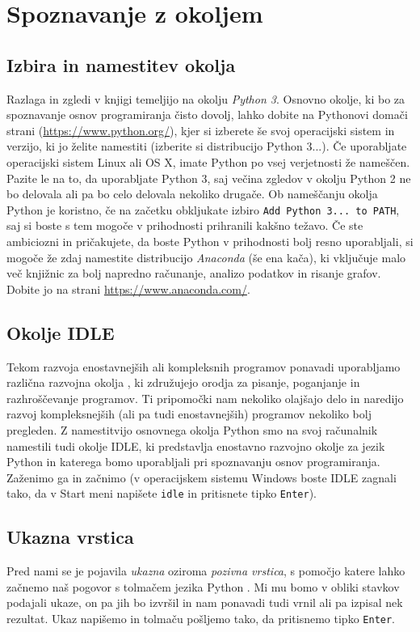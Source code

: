 \chapter{Spoznavanje z okoljem}

\section{Izbira in namestitev okolja}
Razlaga in zgledi v knjigi temeljijo na okolju \emph{Python 3}. Osnovno okolje, ki bo za spoznavanje osnov programiranja čisto dovolj, lahko dobite na Pythonovi domači strani (\url{https://www.python.org/}), kjer si izberete še svoj operacijski sistem in verzijo, ki jo želite namestiti (izberite si distribucijo Python 3...). Če uporabljate operacijski sistem Linux ali OS X, imate Python po vsej verjetnosti že nameščen. Pazite le na to, da uporabljate Python 3, saj večina zgledov v okolju Python 2 ne bo delovala ali pa bo celo delovala nekoliko drugače. Ob nameščanju okolja Python je koristno, če na začetku obkljukate izbiro \texttt{Add Python 3... to PATH}, saj si boste s tem mogoče v prihodnosti prihranili kakšno težavo. Če ste ambiciozni in pričakujete, da boste Python v prihodnosti bolj resno uporabljali, si mogoče že zdaj namestite distribucijo \emph{Anaconda} (še ena kača), ki vključuje malo več knjižnic za bolj napredno računanje, analizo podatkov in risanje grafov. Dobite jo na strani \url{https://www.anaconda.com/}.

\section{Okolje IDLE}

Tekom razvoja enostavnejših ali kompleksnih programov ponavadi uporabljamo različna razvojna okolja , ki združujejo orodja za pisanje, poganjanje in razhroščevanje  programov. Ti pripomočki nam nekoliko olajšajo delo in naredijo razvoj kompleksnejših (ali pa tudi enostavnejših) programov nekoliko bolj pregleden. Z namestitvijo osnovnega okolja Python smo na svoj računalnik namestili tudi okolje IDLE, ki predstavlja enostavno razvojno okolje za jezik Python in katerega bomo uporabljali pri spoznavanju osnov programiranja. Zaženimo ga in začnimo (v operacijskem sistemu Windows boste IDLE zagnali tako, da v Start meni napišete \texttt{idle} in pritisnete tipko \texttt{Enter}).

\section{Ukazna vrstica}
Pred nami se je pojavila \emph{ukazna} oziroma \emph{pozivna vrstica}, s pomočjo katere lahko začnemo naš pogovor s tolmačem jezika Python . Mi mu bomo v obliki stavkov podajali ukaze, on pa jih bo izvršil in nam ponavadi tudi vrnil ali pa izpisal nek rezultat. Ukaz napišemo in tolmaču pošljemo tako, da pritisnemo tipko \texttt{Enter}. 

